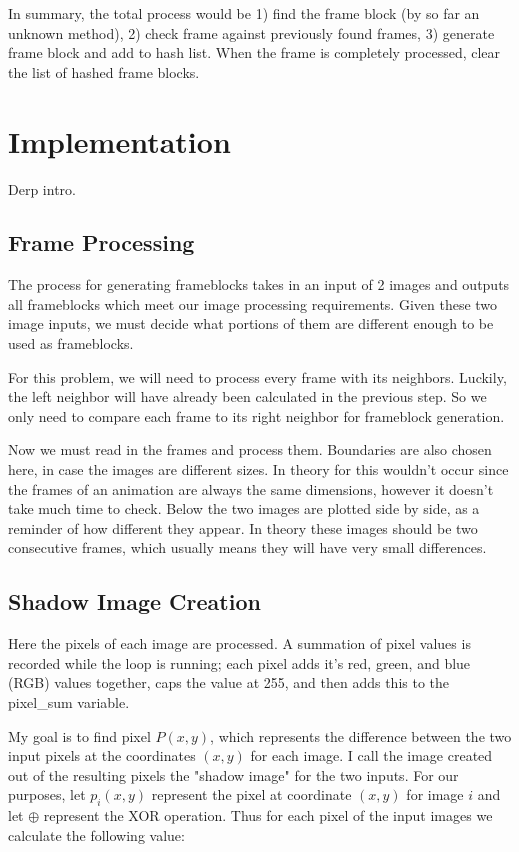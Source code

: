 \documentclass[conference]{IEEEtran}
\begin{document}
In summary, the total process would be 1) find the frame block (by so far an unknown method), 2) check frame against previously found frames, 3) generate frame block and add to hash list. When the frame is completely processed, clear the list of hashed frame blocks.

\section{Implementation}
\label{sec:implementation}
Derp intro.

\subsection{Frame Processing}
\label{subsec:frame_processing}
The process for generating frameblocks takes in an input of 2 images and
outputs all frameblocks which meet our image processing requirements.
Given these two image inputs,
we must decide what portions of them are different enough to be used as frameblocks.

For this problem, we will need to process every frame with its neighbors.
Luckily, the left neighbor will have already been calculated in the previous step.
So we only need to compare each frame to its right neighbor for frameblock generation.

Now we must read in the frames and process them.
Boundaries are also chosen here, in case the images are different sizes.
In theory for this wouldn't occur since the frames of an animation are always the same dimensions,
however it doesn't take much time to check. Below the two images are plotted side by side,
as a reminder of how different they appear.
In theory these images should be two consecutive frames,
which usually means they will have very small differences.

\subsection{Shadow Image Creation}
\label{subsec:shadow_image_creation}
Here the pixels of each image are processed.
A summation of pixel values is recorded while the loop is running;
each pixel adds it's red, green, and blue (RGB) values together,
caps the value at 255, and then adds this to the pixel\_sum variable.

My goal is to find pixel $P(x,y)$,
which represents the difference between the two input
pixels at the coordinates $(x,y)$ for each image.
I call the image created out of the resulting pixels the "shadow image" for the two inputs.
For our purposes, let $p_i(x,y)$ represent the pixel at coordinate
$(x,y)$ for image $i$ and let $\oplus$ represent the XOR operation.
Thus for each pixel of the input images we calculate the following value:
\end{document}
